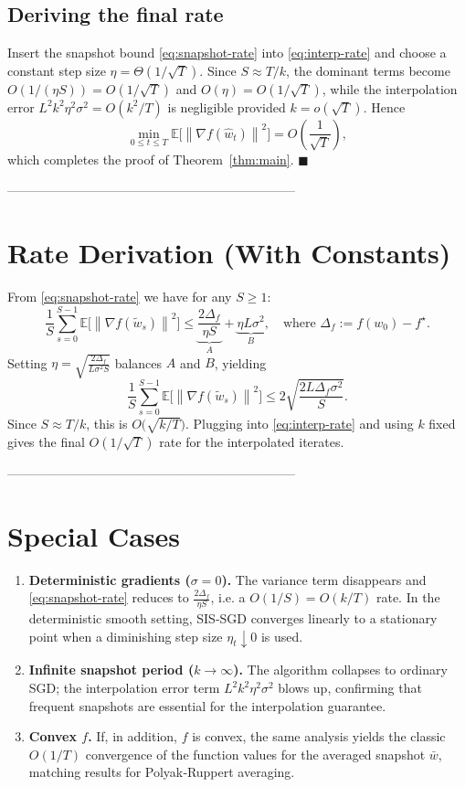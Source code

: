 \documentclass{article}
\newcommand{\EE}{\mathbb{E}}
\newcommand{\norm}[1]{\left\|#1\right\|}
\begin{document}
\subsection*{Deriving the final rate}
Insert the snapshot bound \eqref{eq:snapshot-rate} into \eqref{eq:interp-rate} and choose a constant step size $\eta = \Theta(1/\sqrt{T})$. Since $S\approx T/k$, the dominant terms become $O(1/(\eta S))=O(1/\sqrt{T})$ and $O(\eta)=O(1/\sqrt{T})$, while the interpolation error $L^2k^2\eta^2\sigma^2 = O(k^2/T)$ is negligible provided $k= o(\sqrt{T})$. Hence
\[
\min_{0\le t\le T}\EE\!\bigl[\norm{\nabla f(\hat w_t)}^2\bigr]=O\!\left(\frac{1}{\sqrt{T}}\right),
\]
which completes the proof of Theorem~\ref{thm:main}. \hfill $\blacksquare$

--------------------------------------------------------------------

\section*{Rate Derivation (With Constants)}
From \eqref{eq:snapshot-rate} we have for any $S\ge1$:
\[
\frac{1}{S}\sum_{s=0}^{S-1}\EE\!\bigl[\norm{\nabla f(\tilde w_{s})}^2\bigr]
\le \underbrace{\frac{2\Delta_f}{\eta S}}_{A}
   +\underbrace{\eta L\sigma^2}_{B},
\quad\text{where }\Delta_f:=f(w_0)-f^{\star}.
\]
Setting $\eta = \sqrt{\frac{2\Delta_f}{L\sigma^2 S}}$ balances $A$ and $B$, yielding
\[
\frac{1}{S}\sum_{s=0}^{S-1}\EE\!\bigl[\norm{\nabla f(\tilde w_{s})}^2\bigr]
\le 2\sqrt{\frac{2L\Delta_f\sigma^2}{S}} .
\]
Since $S\approx T/k$, this is $O\!\bigl(\sqrt{k/T}\bigr)$.  
Plugging into \eqref{eq:interp-rate} and using $k$ fixed gives the final $O(1/\sqrt{T})$ rate for the interpolated iterates.

--------------------------------------------------------------------

\section*{Special Cases}
\begin{enumerate}
    \item \textbf{Deterministic gradients ($\sigma=0$).}  
    The variance term disappears and \eqref{eq:snapshot-rate} reduces to
    $\frac{2\Delta_f}{\eta S}$, i.e. a $O(1/S)=O(k/T)$ rate. In the deterministic smooth setting, SIS‑SGD converges linearly to a stationary point when a diminishing step size $\eta_t\downarrow0$ is used.
    \item \textbf{Infinite snapshot period ($k\to\infty$).}  
    The algorithm collapses to ordinary SGD; the interpolation error term $L^2k^2\eta^2\sigma^2$ blows up, confirming that frequent snapshots are essential for the interpolation guarantee.
    \item \textbf{Convex $f$.}  
    If, in addition, $f$ is convex, the same analysis yields the classic $O(1/T)$ convergence of the function values for the averaged snapshot $\bar w$, matching results for Polyak‑Ruppert averaging.
\end{enumerate}
\end{document}
